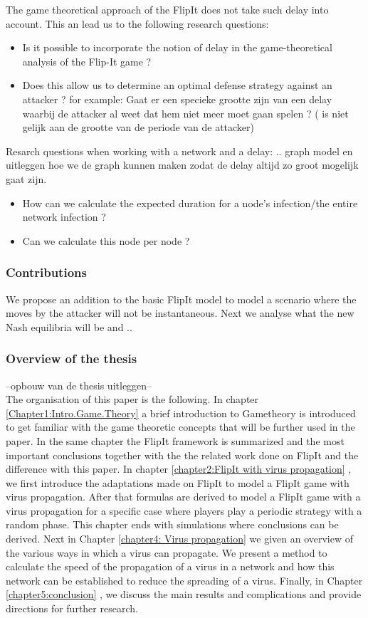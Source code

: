 The game theoretical approach of the FlipIt does not take such delay into account. 
This an lead us to the following research questions:
\begin{itemize}
\item Is it possible to incorporate the notion of delay in the game-theoretical analysis of the Flip-It game ?
\item Does this allow us to determine an optimal defense strategy against an attacker ? for example: Gaat er een specieke grootte zijn van een delay waarbij de attacker al weet dat hem niet meer moet gaan spelen ? ( is niet gelijk aan de grootte van de periode van de attacker)
\end{itemize}



Resarch questions when working with a network and a delay: .. graph model en uitleggen hoe we de graph kunnen maken zodat de delay altijd zo groot mogelijk gaat zijn. 
\begin{itemize}
\item How can we calculate the expected duration for a node's infection/the entire network infection ?
\item Can we calculate this node per node ?
\end{itemize}

\subsubsection{Contributions}
We propose an addition to the basic FlipIt model to model a scenario where the moves by the attacker will not be instantaneous. Next we analyse what the new Nash equilibria will be and .. \\

\subsubsection{Overview of the thesis}
--opbouw van de thesis uitleggen-- \\

The organisation of this paper is the following.  In chapter \ref{Chapter1:Intro.Game.Theory}  a brief introduction to Gametheory is introduced to get familiar with the game theoretic concepts that will be further used in the paper. In the same chapter the FlipIt framework is summarized and the most important conclusions together with the the related work done on FlipIt and the difference with this paper.
In chapter \ref{chapter2:FlipIt with virus propagation} , we first introduce the adaptations made on FlipIt to model a FlipIt game with virus propagation. After that formulas are derived to model a FlipIt game with a virus propagation for a specific case where players play a periodic strategy with a random phase. This chapter ends with simulations where conclusions can be derived.
Next in Chapter \ref{chapter4: Virus propagation} we given an overview of the various ways in which a virus can propagate. We present a method to calculate the speed of the propagation of a virus in a network and how this network can be established to reduce the spreading of a virus.
Finally, in Chapter \ref{chapter5:conclusion} , we discuss the main results and complications and provide directions for further research.

